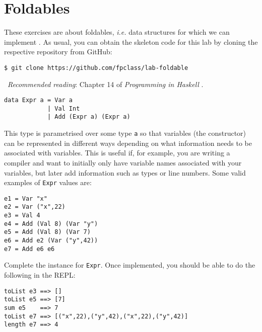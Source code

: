 \section{Foldables}

These exercises are about foldables, \emph{i.e.} data structures for which we can implement . As usual, you can obtain the skeleton code for this lab by cloning the respective repository from GitHub:
\begin{verbatim}
$ git clone https://github.com/fpclass/lab-foldable
\end{verbatim}

\makebox[0.5cm]{\faBook}~\emph{Recommended reading}: Chapter 14 of \emph{Programming in Haskell} \citep{hutton2016programming}.

\taskLine 

\begin{verbatim}
data Expr a = Var a
            | Val Int
            | Add (Expr a) (Expr a)
\end{verbatim}
This type is parametrised over some type \texttt{\small a} so that variables (the  constructor) can be represented in different ways depending on what information needs to be associated with variables. This is useful if, for example, you are writing a compiler and want to initially only have variable names associated with your variables, but later add information such as types or line numbers. Some valid examples of \texttt{\small Expr} values are:
\begin{verbatim}
e1 = Var "x"
e2 = Var ("x",22)
e3 = Val 4 
e4 = Add (Val 8) (Var "y")
e5 = Add (Val 8) (Var 7)
e6 = Add e2 (Var ("y",42))
e7 = Add e6 e6
\end{verbatim}
Complete the  instance for \texttt{\small Expr}. Once implemented, you should be able to do the following in the REPL:
\begin{verbatim}
toList e3 ==> []
toList e5 ==> [7]
sum e5    ==> 7
toList e7 ==> [("x",22),("y",42),("x",22),("y",42)]
length e7 ==> 4
\end{verbatim}

\taskLine

